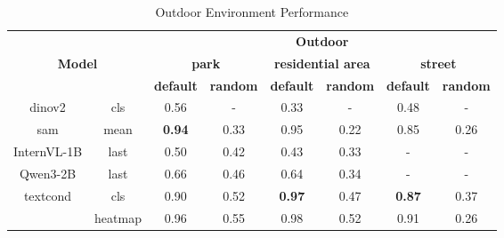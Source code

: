 \begin{table}[h]
\centering
{\small
\begin{tabular}{|c|c|c|c|c|c|c|c|}
\hline
\multicolumn{2}{|c|}{} & \multicolumn{6}{c|}{\textbf{Outdoor}} \\ \cline{3-8} 
\multicolumn{2}{|c|}{\multirow{2}{*}{\textbf{Model}}} & \multicolumn{2}{c|}{\textbf{park}} & \multicolumn{2}{c|}{\textbf{residential area}} & \multicolumn{2}{c|}{\textbf{street}} \\ \cline{3-8} 
\multicolumn{2}{|c|}{} & \textbf{default} & \textbf{random} & \textbf{default} & \textbf{random} & \textbf{default} & \textbf{random} \\ \hline

dinov2 & cls & 0.56 & - & 0.33 & - & 0.48 & - \\ \hline

sam & mean & \textbf{0.94} & 0.33 & 0.95 & 0.22 & 0.85 & 0.26 \\ \hline

InternVL-1B & last & 0.50 & 0.42 & 0.43 & 0.33 & - & - \\ \hline

Qwen3-2B & last & 0.66 & 0.46 & 0.64 & 0.34 & - & - \\ \hline


\multirow{2}{*}{textcond} & cls & 0.90 & 0.52 & \textbf{0.97} & 0.47 & \textbf{0.87} & 0.37 \\ \cline{2-8} 
 & heatmap & 0.96 & 0.55 & 0.98 & 0.52 & 0.91 & 0.26 \\ \hline
\end{tabular}
\caption{Outdoor Environment Performance}
\label{tab:outdoor}
\par}
\end{table}